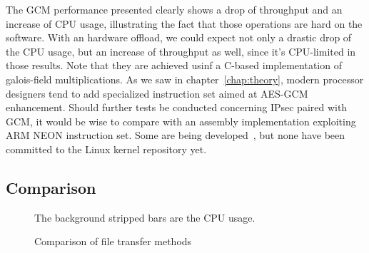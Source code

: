 The GCM performance presented clearly shows a drop of throughput and an increase of CPU usage, illustrating the fact that those operations are hard on the software.
With an hardware offload, we could expect not only a drastic drop of the CPU usage, but an increase of throughput as well, since it's CPU-limited in those results.
Note that they are achieved usinf a C-based implementation of galois-field multiplications.
As we saw in chapter~\ref{chap:theory}, modern processor designers tend to add specialized instruction set aimed at AES-GCM enhancement.
Should further tests be conducted concerning IPsec paired with GCM, it would be wise to compare with an assembly implementation exploiting ARM NEON instruction set.
Some are being developed~\cite{Conrado2013,Danilo2013}, but none have been committed to the Linux kernel repository yet.

\subsection{Comparison}

\begin{figure}[ht]

\caption{Comparison of file transfer methods}{The background stripped bars are the CPU usage.}
\label{fig:ftp-bench-comparison}
\end{figure}